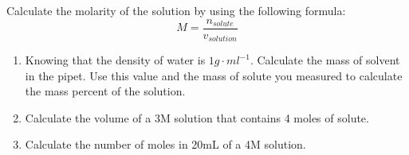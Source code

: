 \documentclass[main.tex]{subfiles}
\begin{document}
\begin{fullwidth}
\begin{center}
\begin{tabular}{ p{4.0cm}p{5.5cm}p{3cm}p{5cm}  }
\hline\end{tabular}\end{center}


Calculate the molarity of the solution by using the following formula:
\begin{equation*}
M=\frac{n_{solute}}{v_{solution}}
\end{equation*}
\hspace{2cm}

\end{fullwidth}


\newpage
\begin{fullwidth}
\vspace{0.2cm}{\large \bfseries PostLab questions }
\begin{enumerate}
\item Knowing that the density of water is $1g\cdot ml^{-1}$. Calculate the mass of solvent in the pipet. Use this value and the mass of solute you measured to calculate the mass percent of the solution.
\vspace{2.5cm}
\item  Calculate the volume of a 3M solution that contains 4 moles of solute.
\vspace{2.5cm}
\item Calculate the number of moles in 20mL of a 4M solution. 
\vspace{2.5cm}
\end{enumerate}

\end{fullwidth}
\end{document}

